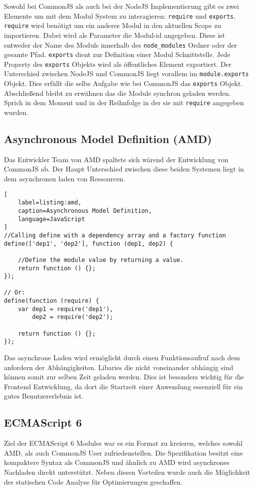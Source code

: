 Sowohl bei CommonJS als auch bei der NodeJS Implementierung gibt es zwei Elemente um mit dem Modul System zu interagieren: \lstinline{require} und \lstinline{exports}. \lstinline{require} wird benötigt um ein anderes Modul in den aktuellen Scope zu importieren. Dabei wird als Parameter die Modul-id angegeben. Diese ist entweder der Name des Moduls innerhalb des \lstinline{node_modules} Ordner oder der gesamte Pfad. \lstinline{exports} dient zur Definition einer Modul Schnittstelle. Jede Property des \lstinline{exports} Objekts wird als öffentliches Element exportiert. Der Unterschied zwischen NodeJS und CommonJS liegt vorallem im \lstinline{module.exports} Objekt. Dies erfüllt die selbe Aufgabe wie bei CommonJS das \lstinline{exports} Objekt. Abschließend bleibt zu erwähnen das die Module synchron geladen werden. Sprich in dem Moment und in der Reihnfolge in der sie mit \lstinline{require} angegeben wurden.\autocite{SebastianPeyrott}

\subsection{Asynchronous Model Definition (AMD)}

Das Entwickler Team von AMD spaltete sich wärend der Entwicklung von CommonJS ab. Der Haupt Unterschied zwischen diese beiden Systemen liegt in dem asynchronen laden von Ressourcen. \autocite{SebastianPeyrott}

\begin{lstlisting}[
    label=listing:amd,
	caption=Asynchronous Model Definition,
	language=JavaScript
]
//Calling define with a dependency array and a factory function
define(['dep1', 'dep2'], function (dep1, dep2) {

    //Define the module value by returning a value.
    return function () {};
});

// Or:
define(function (require) {
    var dep1 = require('dep1'),
        dep2 = require('dep2');

    return function () {};
});
\end{lstlisting}

Das asynchrone Laden wird ermöglicht durch einen Funktionsaufruf nach dem anfordern der  Abhängigkeiten. Libaries die nicht voneinander abhängig sind können somit zur selben Zeit geladen werden. Dies ist besonders wichtig für die Frontend Entwicklung, da dort die Startzeit einer Anwendung essenziell für ein gutes Benutzererlebnis ist. \autocite{SebastianPeyrott}

\subsection{ECMAScript 6}
Ziel der ECMAScript 6 Modules war es ein Format zu kreieren, welches sowohl AMD, als auch CommonJS User zufriedenstellen. Die Spezifikation besitzt eine kompaktere Syntax als CommonJS und ähnlich zu AMD wird asynchrones Nachladen direkt unterstützt. Neben diesen Vorteilen wurde auch die Möglichkeit der statischen Code Analyse für Optimierungen geschaffen. 

